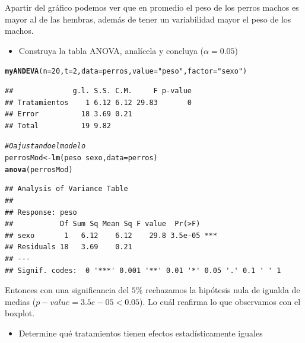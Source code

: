 \documentclass[a4paper]{scrartcl}\usepackage[]{graphicx}\usepackage[]{color}
\makeatletter
\newcommand{\hlnum}[1]{\textcolor[rgb]{0.686,0.059,0.569}{#1}}%
\newcommand{\hlstr}[1]{\textcolor[rgb]{0.192,0.494,0.8}{#1}}%
\newcommand{\hlcom}[1]{\textcolor[rgb]{0.678,0.584,0.686}{\textit{#1}}}%
\newcommand{\hlopt}[1]{\textcolor[rgb]{0,0,0}{#1}}%
\newcommand{\hlstd}[1]{\textcolor[rgb]{0.345,0.345,0.345}{#1}}%
\newcommand{\hlkwb}[1]{\textcolor[rgb]{0.69,0.353,0.396}{#1}}%
\newcommand{\hlkwc}[1]{\textcolor[rgb]{0.333,0.667,0.333}{#1}}%
\newcommand{\hlkwd}[1]{\textcolor[rgb]{0.737,0.353,0.396}{\textbf{#1}}}%
\newenvironment{kframe}{%
 \def\at@end@of@kframe{}%
 \ifinner\ifhmode%
  \def\at@end@of@kframe{\end{minipage}}%
  \begin{minipage}{\columnwidth}%
 \fi\fi%
 \def\FrameCommand##1{\hskip\@totalleftmargin \hskip-\fboxsep
 \colorbox{shadecolor}{##1}\hskip-\fboxsep
     \hskip-\linewidth \hskip-\@totalleftmargin \hskip\columnwidth}%
 \MakeFramed {\advance\hsize-\width
   \@totalleftmargin\z@ \linewidth\hsize
   \@setminipage}}%
 {\par\unskip\endMakeFramed%
 \at@end@of@kframe}
\newenvironment{knitrout}{}{} %
\makeatother
\begin{document}
\begin{itemize}
\begin{itemize}
\begin{knitrout}
{}



\end{knitrout}

Apartir del gráfico podemos ver que en promedio el peso de los perros machos es mayor al de las hembras, además de tener un variabilidad mayor el peso de los machos.

\begin{itemize}
  \item Construya la tabla ANOVA, analícela y concluya ($\alpha = 0.05$)
\end{itemize}

\begin{knitrout}
\color{fgcolor}\begin{kframe}
\begin{alltt}
\hlkwd{myANDEVA}\hlstd{(}\hlkwc{n} \hlstd{=} \hlnum{20}\hlstd{,} \hlkwc{t} \hlstd{=} \hlnum{2}\hlstd{,} \hlkwc{data} \hlstd{= perros,} \hlkwc{value} \hlstd{=} \hlstr{"peso"}\hlstd{,} \hlkwc{factor} \hlstd{=} \hlstr{"sexo"}\hlstd{)}
\end{alltt}
\begin{verbatim}
##              g.l. S.S. C.M.     F p-value
## Tratamientos    1 6.12 6.12 29.83       0
## Error          18 3.69 0.21              
## Total          19 9.82
\end{verbatim}
\begin{alltt}
\hlcom{# O ajustando el modelo}
\hlstd{perrosMod} \hlkwb{<-} \hlkwd{lm}\hlstd{(peso} \hlopt{~} \hlstd{sexo,} \hlkwc{data} \hlstd{= perros)}
\hlkwd{anova}\hlstd{(perrosMod)}
\end{alltt}
\begin{verbatim}
## Analysis of Variance Table
## 
## Response: peso
##           Df Sum Sq Mean Sq F value  Pr(>F)    
## sexo       1   6.12    6.12    29.8 3.5e-05 ***
## Residuals 18   3.69    0.21                    
## ---
## Signif. codes:  0 '***' 0.001 '**' 0.01 '*' 0.05 '.' 0.1 ' ' 1
\end{verbatim}
\end{kframe}
\end{knitrout}

\noindent Entonces con una significancia del $5\%$ rechazamos la hipótesis nula de igualda de medias ($p-value = 3.5e-05 < 0.05$). Lo cuál reafirma lo que observamos con el boxplot.

\begin{itemize}
  \item Determine qué tratamientos tienen efectos estadísticamente iguales
\end{itemize}


\end{itemize}
\end{itemize}
\end{document}
